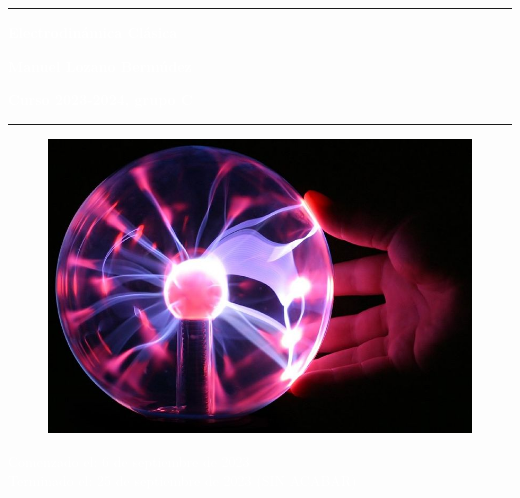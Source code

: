\begin{titlepage}
   \raggedright
       \vspace*{1cm}
       \textcolor{white}{\rule{\textwidth}{2pt}}
        \HUGE
       {\rmfamily \textbf{\textcolor{white}{Electrodinámica Clásica}}}
       
        \Large
       \vspace{0.5cm}
       {\rmfamily \textbf{\textcolor{white}{Manuel Lozano Bermúdez}}}

       \large
       \vspace{0.5 cm}
       {\rmfamily \textbf{\textcolor{white}{Curso 2023-2024, grupo C}}}
       \textcolor{white}{\rule{\textwidth}{2pt}}
        \vspace{1.5 cm}
       \begin{figure}[h]
           \centering
           \includegraphics[scale=.4]{FOTOS/portada.jpg}
           \label{fig:portada}
       \end{figure}

        \vspace*{\fill}
        
         \Large
         {\rmfamily \textcolor{white}{Comenzado el: 6 de septiembre de 2023}\\}
         {\rmfamily \textcolor{white}{Terminado el: 25 de septiembre de 2023 (SIN ACABAR)}}


\end{titlepage}